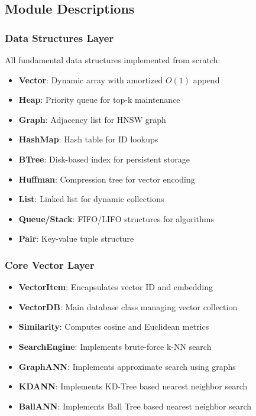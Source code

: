 \documentclass[12pt,a4paper]{article}
\begin{document}
\subsection{Module Descriptions}

\subsubsection{Data Structures Layer}
All fundamental data structures implemented from scratch:
\begin{itemize}
    \item \textbf{Vector}: Dynamic array with amortized $O(1)$ append
    \item \textbf{Heap}: Priority queue for top-k maintenance
    \item \textbf{Graph}: Adjacency list for HNSW graph
    \item \textbf{HashMap}: Hash table for ID lookups
    \item \textbf{BTree}: Disk-based index for persistent storage
    \item \textbf{Huffman}: Compression tree for vector encoding
    \item \textbf{List}: Linked list for dynamic collections
    \item \textbf{Queue/Stack}: FIFO/LIFO structures for algorithms
    \item \textbf{Pair}: Key-value tuple structure
\end{itemize}

\subsubsection{Core Vector Layer}
\begin{itemize}
    \item \textbf{VectorItem}: Encapsulates vector ID and embedding
    \item \textbf{VectorDB}: Main database class managing vector collection
    \item \textbf{Similarity}: Computes cosine and Euclidean metrics
    \item \textbf{SearchEngine}: Implements brute-force k-NN search
    \item \textbf{GraphANN}: Implements approximate search using graphs
    \item \textbf{KDANN}: Implements KD-Tree based nearest neighbor search
    \item \textbf{BallANN}: Implements Ball Tree based nearest neighbor search
\end{itemize}
\end{document}

